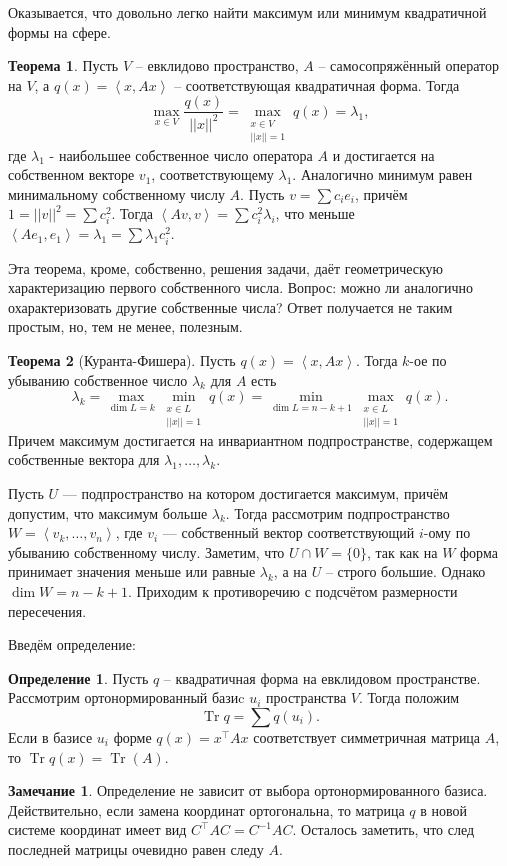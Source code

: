 \documentclass[10pt,a4paper,oneside]{book}
\theoremstyle{definition}
\newtheorem*{rem}{Замечание}
\newtheorem*{defn}{{\color{yellow!20!red} Определение}}
\newtheorem{thm}{{\color{red!40!black} Теорема}}
\newcommand{\Tr}{\operatorname{Tr}}
\def\lan{\left\langle }
\def\ran{\right\rangle}
\def\thrm{\begin{thm}}
\def\ethrm{\end{thm}}
\def\dfn{\begin{defn}}
\def\edfn{\end{defn}}
\def\rm{\begin{rem}}
\def\erm{\end{rem}}
\begin{document}
Оказывается, что довольно легко найти максимум или минимум квадратичной формы на сфере.



\thrm Пусть $V$ -- евклидово пространство, $A$ -- самосопряжённый оператор на $V$, а $q(x)=\lan x,Ax\ran$ -- соответствующая квадратичная форма. Тогда 
$$\max_{ x\in V } \frac{q(x)}{||x||^2}=\max_{\substack{ x\in V \\ ||x||=1}} q(x)=\lambda_1,$$
 где $\lambda_1$ - наибольшее собственное число оператора $A$ и достигается на собственном векторе $v_1$, соответствующему $\lambda_1$. Аналогично минимум равен минимальному собственному числу $A$. 
\proof
Пусть $v=\sum c_i e_i$, причём $1=||v||^2=\sum c_i^2$. Тогда $\lan Av,v\ran = \sum c^2_i \lambda_i $, что меньше $\lan A e_1,e_1\ran= \lambda_1= \sum \lambda_1 c_i^2$.
\endproof
\ethrm

Эта теорема, кроме, собственно, решения задачи, даёт геометрическую характеризацию первого собственного числа. Вопрос: можно ли аналогично охарактеризовать другие собственные числа? Ответ получается не таким простым, но, тем не менее, полезным.

\thrm[Куранта-Фишера] Пусть $q(x)=\lan x, Ax\ran$. Тогда $k$-ое по убыванию собственное число $\lambda_k$ для $A$ есть 
$$ \lambda_k=\max_{\dim L=k} \min_{\substack{ x\in L \\ ||x||=1}} q(x) = \min_{\dim L=n-k+1} \max_{\substack{ x\in L \\ ||x||=1}} q(x).$$
Причем максимум достигается на инвариантном подпространстве, содержащем собственные вектора для $\lambda_1,\dots,\lambda_k$.
\ethrm
\proof Пусть $U$ --- подпространство на котором достигается максимум, причём допустим, что максимум больше $\lambda_k$. Тогда рассмотрим подпространство $W=\lan v_k,\dots,v_n\ran$, где $v_i$ --- собственный вектор соответствующий $i$-ому по убыванию собственному числу. Заметим, что $U\cap W=\{0\}$, так как на $W$ форма принимает значения меньше или равные $\lambda_k$, а на $U$ -- строго большие. Однако $\dim W=n-k+1$. Приходим к противоречию с подсчётом размерности пересечения. 
\endproof


Введём определение:
\dfn
Пусть $q$ -- квадратичная форма на евклидовом пространстве. Рассмотрим ортонормированный базиc $u_i$ пространства $V$. Тогда положим 
$$\Tr q= \sum q(u_i).$$ Если в базисе $u_i$ форме $q(x)=x^{\top} Ax $ соответствует симметричная матрица $A$, то $\Tr q(x)=\Tr(A)$.
\edfn

\rm Определение не зависит от выбора ортонормированного базиса. Действительно, если замена координат ортогональна, то матрица $q$ в новой системе координат имеет вид $C^{\top}AC=C^{-1}AC$. Осталось заметить, что след последней матрицы очевидно равен следу $A$.
\erm
\end{document}
